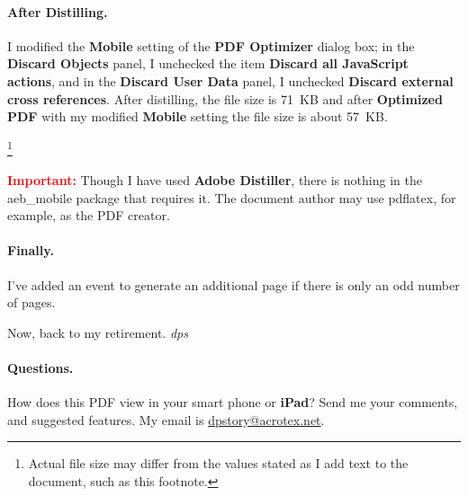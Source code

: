 \documentclass[\ifsmartphone12pt\fi,fleqn]{article}
\def\nlfootnote#1{\begin{NoHyper}\footnote{#1}\end{NoHyper}}
\begin{document}
\paragraph*{\color{blue}After Distilling.} I modified the \textbf{Mobile} setting
of the \textbf{\textsf{PDF} Optimizer} dialog box; in the \textbf{Discard
Objects} panel, I unchecked the item \textbf{Discard all Java\-Script
actions}, and in the \textbf{Discard User Data} panel, I unchecked
\textbf{Discard external cross references}. After distilling, the file
size is 71~KB and after \textbf{\textsf{Optimized \textsf{PDF}}} with my
modified \textbf{Mobile} setting the file size is about
57~KB.\nlfootnote{Actual file size may differ from the values stated as I
add text to the document, such as this footnote.}

\textbf{\textcolor{red}{Important:}} Though I have used \textbf{Adobe Distiller}, 
there is nothing in the \textsf{aeb\_mobile}
package that requires it. The document author may use \textsf{pdflatex}, for
example, as the PDF creator.

\paragraph*{\color{blue}Finally.}
I've added an \texttt{\string\AtEndDocument} event to generate an
additional page if there is only an odd number of pages.

Now, back to my retirement. \textsl{dps}

\bigbreak

\paragraph*{\color{red}Questions.}
How does this \textsf{PDF} view in your smart phone or
\textbf{\textsf{iPad}}? Send me your comments, and suggested features. My
email is \href{mailto:dpstory@acrotex.net}{dpstory@acrotex.net}.
\end{document}
